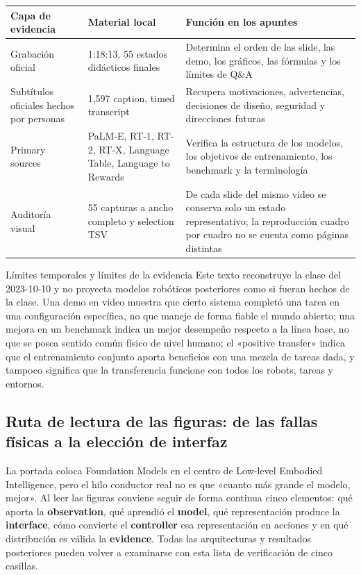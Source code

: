 \documentclass[a4paper]{article}
\begin{document}
\begin{longtable}{@{}L{0.18\textwidth}L{0.31\textwidth}L{0.39\textwidth}@{}}
\toprule
Capa de evidencia & Material local & Función en los apuntes \\
\midrule
Grabación oficial & 1:18:13, 55 estados didácticos finales & Determina el orden de las slide, las demo, los gráficos, las fórmulas y los límites de Q\&A \\
Subtítulos oficiales hechos por personas & 1,597 caption, timed transcript & Recupera motivaciones, advertencias, decisiones de diseño, seguridad y direcciones futuras \\
Primary sources & PaLM-E, RT-1, RT-2, RT-X, Language Table, Language to Rewards & Verifica la estructura de los modelos, los objetivos de entrenamiento, los benchmark y la terminología \\
Auditoría visual & 55 capturas a ancho completo y selection TSV & De cada slide del mismo video se conserva solo un estado representativo; la reproducción cuadro por cuadro no se cuenta como páginas distintas \\
\bottomrule
\end{longtable}

\begin{warningbox}{Límites temporales y límites de la evidencia}
Este texto reconstruye la clase del 2023-10-10 y no proyecta modelos robóticos posteriores como si fueran hechos de la clase. Una demo en video muestra que cierto sistema completó una tarea en una configuración específica, no que maneje de forma fiable el mundo abierto; una mejora en un benchmark indica un mejor desempeño respecto a la línea base, no que se posea sentido común físico de nivel humano; el «positive transfer» indica que el entrenamiento conjunto aporta beneficios con una mezcla de tareas dada, y tampoco significa que la transferencia funcione con todos los robots, tareas y entornos.
\end{warningbox}

\subsection{Ruta de lectura de las figuras: de las fallas físicas a la elección de interfaz}

La portada coloca Foundation Models en el centro de Low-level Embodied Intelligence, pero el hilo conductor real no es que «cuanto más grande el modelo, mejor». Al leer las figuras conviene seguir de forma continua cinco elementos: qué aporta la \textbf{observation}, qué aprendió el \textbf{model}, qué representación produce la \textbf{interface}, cómo convierte el \textbf{controller} esa representación en acciones y en qué distribución es válida la \textbf{evidence}. Todas las arquitecturas y resultados posteriores pueden volver a examinarse con esta lista de verificación de cinco casillas.
\end{document}
